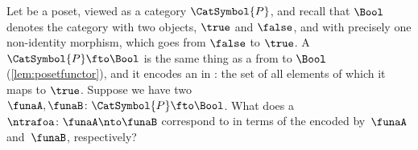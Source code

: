
\begin{gradedexercise}
    \label{ex:UpperSetsNatTrafos}
    Let \posA be a poset, viewed as a category $\CatSymbol{P}$, and recall that $\Bool$ denotes the category with two objects, $\true$ and $\false$, and with precisely one non-identity morphism, which goes from $\false$ to $\true$.
    A  $\CatSymbol{P} \fto \Bool$ is the same thing as a  from \posA to $\Bool$ (\cref{lem:posetfunctor}), and it encodes an  in \posA: the set of all elements of \posA which it maps to $\true$.
    Suppose we have two ~$\funaA, \funaB \colon \CatSymbol{P} \fto \Bool$.
    What does a ~$\ntrafoa \colon \funaA \nto \funaB$ correspond to in terms of the  encoded by~$\funaA$ and~$\funaB$, respectively?
\end{gradedexercise}




